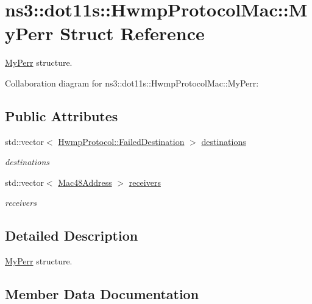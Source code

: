 \hypertarget{structns3_1_1dot11s_1_1HwmpProtocolMac_1_1MyPerr}{}\section{ns3\+:\+:dot11s\+:\+:Hwmp\+Protocol\+Mac\+:\+:My\+Perr Struct Reference}
\label{structns3_1_1dot11s_1_1HwmpProtocolMac_1_1MyPerr}


\hyperlink{structns3_1_1dot11s_1_1HwmpProtocolMac_1_1MyPerr}{My\+Perr} structure.  




Collaboration diagram for ns3\+:\+:dot11s\+:\+:Hwmp\+Protocol\+Mac\+:\+:My\+Perr\+:
\subsection*{Public Attributes}
\begin{DoxyCompactItemize}
\item 
std\+::vector$<$ \hyperlink{structns3_1_1dot11s_1_1HwmpProtocol_1_1FailedDestination}{Hwmp\+Protocol\+::\+Failed\+Destination} $>$ \hyperlink{structns3_1_1dot11s_1_1HwmpProtocolMac_1_1MyPerr_a160a43a10420461a9928aa25f5626dca}{destinations}
\begin{DoxyCompactList}\small\item\em destinations \end{DoxyCompactList}\item 
std\+::vector$<$ \hyperlink{classns3_1_1Mac48Address}{Mac48\+Address} $>$ \hyperlink{structns3_1_1dot11s_1_1HwmpProtocolMac_1_1MyPerr_a9ecf059f0bd93868766ad55de8402784}{receivers}
\begin{DoxyCompactList}\small\item\em receivers \end{DoxyCompactList}\end{DoxyCompactItemize}


\subsection{Detailed Description}
\hyperlink{structns3_1_1dot11s_1_1HwmpProtocolMac_1_1MyPerr}{My\+Perr} structure. 

\subsection{Member Data Documentation}
